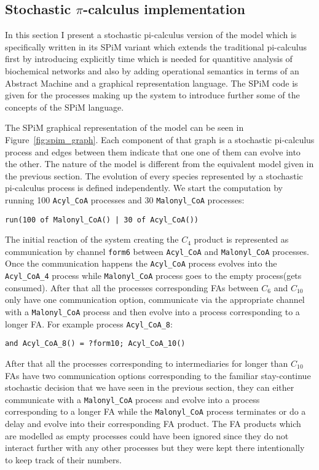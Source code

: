 \subsection{Stochastic $\pi$-calculus implementation}
In this section I present a stochastic pi-calculus version of the
model which is specifically written in its SPiM variant which extends
the traditional pi-calculus first by introducing explicitly time which
is needed for quantitive analysis of biochemical networks and also by
adding operational semantics in terms of an Abstract Machine and a
graphical representation language. The SPiM code is given for the
processes making up the system to introduce further some of the
concepts of the SPiM language.

The SPiM graphical representation of the model can be seen in
Figure~\ref{fig:spim_graph}. Each component of that graph is a
stochastic pi-calculus process and edges between them indicate that
one one of them can evolve into the other. The nature of the model is
different from the equivalent model given in the previous section. The
evolution of every species represented by a stochastic pi-calculus
process is defined independently. We start the computation by running 100
\texttt{Acyl\_CoA} processes and 30 \texttt{Malonyl\_CoA} processes:

\begin{verbatim}
run(100 of Malonyl_CoA() | 30 of Acyl_CoA())
\end{verbatim}

The initial reaction of the system creating the $C_4$ product is represented as
communication by channel \texttt{form6} between \texttt{Acyl\_CoA} and
\texttt{Malonyl\_CoA} processes. Once the communication happens the
\texttt{Acyl\_CoA} process evolves into the  \texttt{Acyl\_CoA\_4}
process while \texttt{Malonyl\_CoA} process goes to the empty
process(gets consumed). After that all the processes corresponding
FAs between $C_6$ and $C_{10}$ only have one communication option,
communicate via the appropriate channel with a \texttt{Malonyl\_CoA}
process and then evolve into a process corresponding to a longer
FA. For example process \texttt{Acyl\_CoA\_8}:

\begin{verbatim}
and Acyl_CoA_8() = ?form10; Acyl_CoA_10()
\end{verbatim}

After that all the processes corresponding to intermediaries for longer
than $C_{10}$ FAs have two communication options corresponding to the familiar
stay-continue stochastic decision that we have seen in the previous section, they
can either communicate with a \texttt{Malonyl\_CoA} process and evolve
into a process corresponding to a longer FA while the
\texttt{Malonyl\_CoA} process terminates or do a delay and evolve into
their corresponding FA product. The FA products which are modelled as
empty processes could have been ignored since they do not interact
further with any other processes but they were kept there
intentionally to keep track of their numbers.

